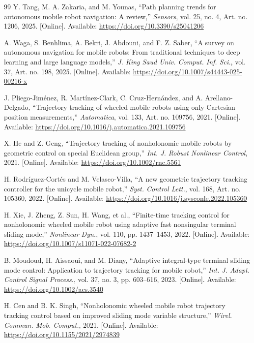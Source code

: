 \begin{thebibliography}{99}
Y. Tang, M. A. Zakaria, and M. Younas, ``Path planning trends for autonomous mobile robot navigation: A review,'' \emph{Sensors}, vol. 25, no. 4, Art. no. 1206, 2025. [Online]. Available: \url{https://doi.org/10.3390/s25041206} 

A. Waga, S. Benhlima, A. Bekri, J. Abdouni, and F. Z. Saber, ``A survey on autonomous navigation for mobile robots: From traditional techniques to deep learning and large language models,'' \emph{J. King Saud Univ. Comput. Inf. Sci.}, vol. 37, Art. no. 198, 2025. [Online]. Available: \url{https://doi.org/10.1007/s44443-025-00216-x}

J. Pliego-Jim\'enez, R. Mart\'inez-Clark, C. Cruz-Hern\'andez, and A. Arellano-Delgado, ``Trajectory tracking of wheeled mobile robots using only Cartesian position measurements,'' \emph{Automatica}, vol. 133, Art. no. 109756, 2021. [Online]. Available: \url{https://doi.org/10.1016/j.automatica.2021.109756}

X. He and Z. Geng, ``Trajectory tracking of nonholonomic mobile robots by geometric control on special Euclidean group,'' \emph{Int. J. Robust Nonlinear Control}, 2021. [Online]. Available: \url{https://doi.org/10.1002/rnc.5561}

H. Rodr\'iguez-Cort\'es and M. Velasco-Villa, ``A new geometric trajectory tracking controller for the unicycle mobile robot,'' \emph{Syst. Control Lett.}, vol. 168, Art. no. 105360, 2022. [Online]. Available: \url{https://doi.org/10.1016/j.sysconle.2022.105360}

H. Xie, J. Zheng, Z. Sun, H. Wang, et al., ``Finite-time tracking control for nonholonomic wheeled mobile robot using adaptive fast nonsingular terminal sliding mode,'' \emph{Nonlinear Dyn.}, vol. 110, pp. 1437--1453, 2022. [Online]. Available: \url{https://doi.org/10.1007/s11071-022-07682-2}

B. Moudoud, H. Aissaoui, and M. Diany, ``Adaptive integral-type terminal sliding mode control: Application to trajectory tracking for mobile robot,'' \emph{Int. J. Adapt. Control Signal Process.}, vol. 37, no. 3, pp. 603--616, 2023. [Online]. Available: \url{https://doi.org/10.1002/acs.3540}

H. Cen and B. K. Singh, ``Nonholonomic wheeled mobile robot trajectory tracking control based on improved sliding mode variable structure,'' \emph{Wirel. Commun. Mob. Comput.}, 2021. [Online]. Available: \url{https://doi.org/10.1155/2021/2974839}


\end{thebibliography}
